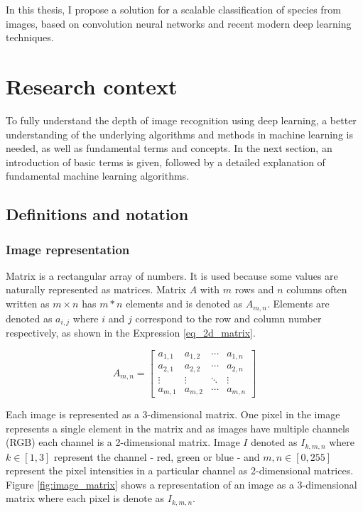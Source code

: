 \documentclass[times, utf8, diplomski]{fer}
\begin{document}
In this thesis, I propose a solution for a scalable classification of species from images, based on convolution neural networks and recent modern deep learning techniques.

\chapter{Research context}
To fully understand the depth of image recognition using deep learning, a better understanding of the underlying algorithms and methods in machine learning is needed, as well as fundamental terms and concepts. In the next section, an introduction of basic terms is given, followed by a detailed explanation of fundamental machine learning algorithms.

\section{Definitions and notation}

\subsection{Image representation}
Matrix is a rectangular array of numbers. It is used because some values are naturally represented as matrices. Matrix $A$ with $m$ rows and $n$ columns often written as $m \times n$ has $m*n$ elements and is denoted as $A_{m,n}$. Elements are denoted as $a_{i,j}$ where $i$ and $j$ correspond to the row and column number respectively, as shown in the Expression \ref{eq_2d_matrix}. 

\begin{equation} \label{eq_2d_matrix}
A_{m,n} = 
 \begin{bmatrix}
  a_{1,1} & a_{1,2} & \cdots & a_{1,n} \\
  a_{2,1} & a_{2,2} & \cdots & a_{2,n} \\
  \vdots  & \vdots  & \ddots & \vdots  \\
  a_{m,1} & a_{m,2} & \cdots & a_{m,n} 
 \end{bmatrix}
\end{equation}


Each image is represented as a 3-dimensional matrix. One pixel in the image represents a single element in the matrix and as images have multiple channels (RGB) each channel is a 2-dimensional matrix. Image $I$ denoted as $I_{k,m,n}$ where $k\in[1,3]$ represent the channel - red, green or blue - and $m,n\in[0,255]$ represent the pixel intensities in a particular channel as 2-dimensional matrices. Figure \ref{fig:image_matrix} shows a representation of an image as a 3-dimensional matrix where each pixel is denote as $I_{k,m,n}$.
\end{document}

